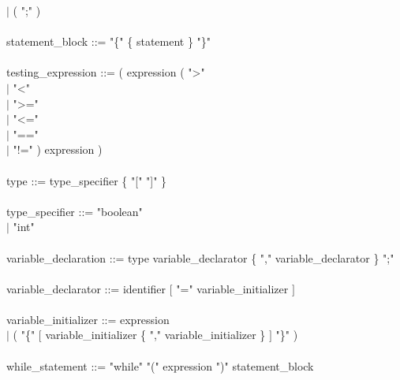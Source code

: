 \documentclass[10pt,a4paper,titlepage]{article}
\begin{document}
\begin{ttfamily}
		\hspace*{3cm}$\mid$ ( ";" ) \\
\\		
statement\_block ::= "\{" \{ statement \} "\}" \\
\\
testing\_expression ::= ( expression ( ">" \\
					\hspace*{7cm}$\mid$ "<" \\
					\hspace*{7cm}$\mid$ ">=" \\
					\hspace*{7cm}$\mid$ "<=" \\
					\hspace*{7cm}$\mid$ "==" \\
					\hspace*{7cm}$\mid$ "!=" ) expression ) \\
\\
type ::= type\_specifier \{ "[" "]" \} \\
\\
type\_specifier ::= "boolean" \\
		\hspace*{3.8cm}$\mid$ "int" \\
\\
variable\_declaration ::= type variable\_declarator \{ "," variable\_declarator \} ";" \\
\\
variable\_declarator ::= identifier $[$ "=" variable\_initializer $]$ \\
\\
variable\_initializer ::= expression \\
		\hspace*{4.8cm}$\mid$ ( "\{" $[$ variable\_initializer \{ "," variable\_initializer \} $]$ "\}" ) \\
\\
while\_statement ::= "while" "(" expression ")" statement\_block \\
\end{ttfamily}
\end{document}
